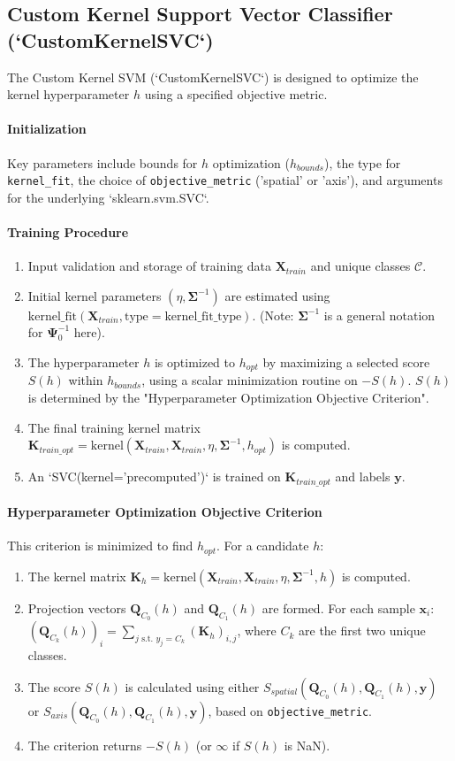 \documentclass[conference]{IEEEtran} %
\newcommand{\mat}[1]{\mathbf{#1}} %
\newcommand{\vecbf}[1]{\bm{#1}} %
\begin{document}
\subsection{Custom Kernel Support Vector Classifier (`CustomKernelSVC`)}
The Custom Kernel SVM (`CustomKernelSVC`) is designed to optimize the kernel hyperparameter $h$ using a specified objective metric.
\paragraph{Initialization} Key parameters include bounds for $h$ optimization ($h_{bounds}$), the type for \texttt{kernel\_fit}, the choice of \texttt{objective\_metric} ('spatial' or 'axis'), and arguments for the underlying `sklearn.svm.SVC`.
\paragraph{Training Procedure}
\begin{enumerate}
    \item Input validation and storage of training data $\mat{X}_{train}$ and unique classes $\mathcal{C}$.
    \item Initial kernel parameters $(\eta, \mat{\Sigma}^{-1})$ are estimated using $\text{kernel\_fit}(\mat{X}_{train}, \text{type}=\text{kernel\_fit\_type})$. (Note: $\mat{\Sigma}^{-1}$ is a general notation for $\mat{\Psi}^{-1}_0$ here).
    \item The hyperparameter $h$ is optimized to $h_{opt}$ by maximizing a selected score $S(h)$ within $h_{bounds}$, using a scalar minimization routine on $-S(h)$. $S(h)$ is determined by the "Hyperparameter Optimization Objective Criterion".
    \item The final training kernel matrix $\mat{K}_{train\_opt} = \text{kernel}(\mat{X}_{train}, \mat{X}_{train}, \eta, \mat{\Sigma}^{-1}, h_{opt})$ is computed.
    \item An `SVC(kernel='precomputed')` is trained on $\mat{K}_{train\_opt}$ and labels $\vecbf{y}$.
\end{enumerate}
\paragraph{Hyperparameter Optimization Objective Criterion}
This criterion is minimized to find $h_{opt}$. For a candidate $h$:
\begin{enumerate}
    \item The kernel matrix $\mat{K}_h = \text{kernel}(\mat{X}_{train}, \mat{X}_{train}, \eta, \mat{\Sigma}^{-1}, h)$ is computed.
    \item Projection vectors $\vecbf{Q}_{C_0}(h)$ and $\vecbf{Q}_{C_1}(h)$ are formed. For each sample $\vecbf{x}_i$:
        $(\vecbf{Q}_{C_k}(h))_i = \sum_{j \text{ s.t. } y_j = C_k} (\mat{K}_h)_{i,j}$, where $C_k$ are the first two unique classes.
    \item The score $S(h)$ is calculated using either $S_{spatial}(\vecbf{Q}_{C_0}(h), \vecbf{Q}_{C_1}(h), \vecbf{y})$ or $S_{axis}(\vecbf{Q}_{C_0}(h), \vecbf{Q}_{C_1}(h), \vecbf{y})$, based on \texttt{objective\_metric}.
    \item The criterion returns $-S(h)$ (or $\infty$ if $S(h)$ is NaN).
\end{enumerate}
\end{document}
